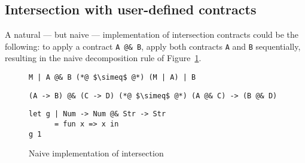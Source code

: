 \documentclass[sigplan,screen,10pt]{acmart}
\newcommand{\nickel}[1]{\lstinline[language=nickel]{#1}}
\begin{document}
%


\subsection{Intersection with user-defined contracts}
\label{sec:flat-and-inter}

A natural --- but naive --- implementation of intersection contracts could be the
following: to apply a contract \nickel{A @& B}, apply both contracts \nickel{A}
and \nickel{B} sequentially, resulting in the naive decomposition rule of
Figure~\ref{fig:naive-impl}.

\begin{figure}[h]
\begin{lstlisting}[language=nickel,frame=none,numbers=none,title={Naive
decomposition}]
M | A @& B (*@ $\simeq$ @*) (M | A) | B
\end{lstlisting}
\begin{lstlisting}[language=nickel,frame=none,numbers=none,title={Exchange law}]
(A -> B) @& (C -> D) (*@ $\simeq$ @*) (A @& C) -> (B @& D)
\end{lstlisting}
\begin{lstlisting}[language=nickel,title={Overloaded identity}]
let g | Num -> Num @& Str -> Str
      = fun x => x in
g 1
\end{lstlisting}
\caption{Naive implementation of intersection}
\label{fig:naive-impl}
\end{figure}
\end{document}
